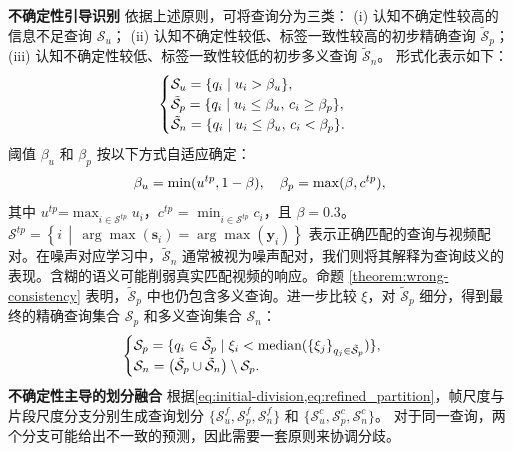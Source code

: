 \noindent \textbf{不确定性引导识别} \quad \label{method:ugi}
依据上述原则，可将查询分为三类：
(i) 认知不确定性较高的信息不足查询 $\mathcal{S}_{u}$；
(ii) 认知不确定性较低、标签一致性较高的初步精确查询 $\mathcal{\tilde{S}}_{p}$；
(iii) 认知不确定性较低、标签一致性较低的初步多义查询 $\mathcal{\tilde{S}}_{n}$。
形式化表示如下：
\vspace{-.6em}
\begin{equation}
\begin{cases} 
\mathcal{S}_{u} = \{q_i \mid u_i > \beta_u\}, \\ 
\mathcal{\tilde{S}}_{p} = \{q_i \mid u_i \le \beta_u,\, c_i \ge \beta_p\}, \\
\mathcal{\tilde{S}}_{n} = \{q_i \mid u_i \le \beta_u,\, c_i < \beta_p\}.
\end{cases}    
\label{eq:initial-division}
\vspace{-.6em}
\end{equation}
阈值 $\beta_u$ 和 $\beta_p$ 按以下方式自适应确定：
\vspace{-.6em}
\begin{equation}
    \beta_u = \min(u^{tp}, 1 - \beta), \quad 
    \beta_p = \max(\beta, c^{tp}),
    \label{eq:threshold}
\vspace{-.6em}
\end{equation}
其中 $u^{tp}$=$\max_{i \in \mathcal{S}^{tp}} u_i$，$c^{tp}$ = $\min_{i \in \mathcal{S}^{tp}} c_i$，且 $\beta=0.3$。$\mathcal{S}^{tp}= \left\{ i \,\middle|\, \arg\max(\boldsymbol{s}_i) = \arg\max(\boldsymbol{y}_i) \right\}$ 表示正确匹配的查询与视频配对。在噪声对应学习中，$\mathcal{\tilde{S}}_{n}$ 通常被视为噪声配对，我们则将其解释为查询歧义的表现。含糊的语义可能削弱真实匹配视频的响应。命题 \ref{theorem:wrong-consistency} 表明，$\mathcal{\tilde{S}}_{p}$ 中也仍包含多义查询。进一步比较 $\xi$，对 $\mathcal{\tilde{S}}_{p}$ 细分，得到最终的精确查询集合 $\mathcal{S}_{p}$ 和多义查询集合 $\mathcal{S}_{n}$：
\vspace{-.6em}
\begin{equation}
\begin{cases}
\mathcal{S}_p = \{ q_i \in \mathcal{\tilde{S}}_p \mid \xi_i < \text{median}(\{\xi_j\}_{q_j \in \mathcal{\tilde{S}}_p}) \}, \\
\mathcal{S}_n = \bigl( \mathcal{\tilde{S}}_p \cup \mathcal{\tilde{S}}_n \bigr) \setminus \mathcal{S}_p.
\end{cases}
\label{eq:refined_partition}
\vspace{-.6em}
\end{equation}
\noindent\textbf{不确定性主导的划分融合} \quad
根据\cref{eq:initial-division,eq:refined_partition}，帧尺度与片段尺度分支分别生成查询划分 $\{\mathcal{S}_u^f, \mathcal{S}_p^f, \mathcal{S}_n^f\}$ 和 $\{\mathcal{S}_u^c, \mathcal{S}_p^c, \mathcal{S}_n^c\}$。
对于同一查询，两个分支可能给出不一致的预测，因此需要一套原则来协调分歧。

